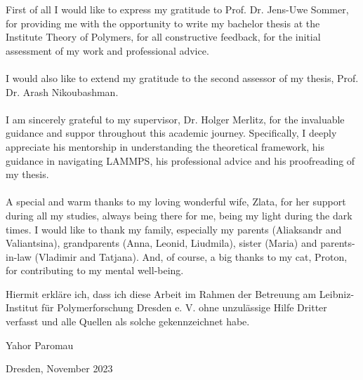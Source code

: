 \documentclass[
    paper=A4,pagesize=automedia,fontsize=12pt,
    BCOR=15mm,DIV=22,
    twoside,headinclude,footinclude=false,
    fleqn,             %
    bibliography=totocnumbered,          %
    listof=totoc,                %
    listof=flat,                 %
    cleardoublepage=empty      %
    numbers=endperiod
]{scrartcl}
\begin{document}
\clearpage



\clearpage
\thispagestyle{empty}
\vspace*{1.5em}
First of all I would like to express my gratitude to Prof. Dr. Jens-Uwe Sommer, 
for providing me with the opportunity to write my bachelor 
thesis at the Institute Theory of Polymers, 
for all constructive feedback, for the initial assessment of my work and 
professional advice.
\\
\\
I would also like to extend my gratitude to the second assessor 
of my thesis, Prof. Dr. Arash Nikoubashman.
\\
\\
I am sincerely grateful to my supervisor, 
Dr. Holger Merlitz, for the invaluable guidance and suppor throughout this academic journey.
Specifically,
I deeply appreciate his mentorship in understanding the theoretical framework, 
his guidance in navigating LAMMPS, his professional advice
and his proofreading of my thesis.
\\
\\
A special and warm thanks to my loving wonderful wife, Zlata, for her support
during all my studies, always being there for me, being my light during the dark times.
I would like to thank my family, especially my parents (Aliaksandr and Valiantsina), 
grandparents (Anna, Leonid, Liudmila), sister (Maria) and 
parents-in-law (Vladimir and Tatjana). And, 
of course, a big thanks to my cat, Proton, for contributing
to my mental well-being.

\clearpage
\thispagestyle{empty}
\vspace*{1.5em}

Hiermit erkläre ich, dass ich diese Arbeit im Rahmen der Betreuung am Leibniz-Institut für Polymerforschung Dresden e. V.
ohne unzulässige Hilfe Dritter verfasst und alle Quellen als solche gekennzeichnet habe.

\vspace*{45em}

Yahor Paromau \par
Dresden, November 2023
\end{document}
